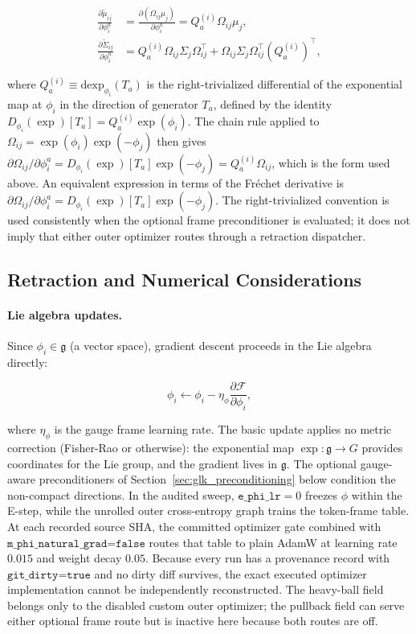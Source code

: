 \documentclass[twoside,11pt]{article}
\begin{document}
\begin{align}
\frac{\partial \tilde{\mu}_{ij}}{\partial \phi_i^a} &= \frac{\partial (\Omega_{ij}\mu_j)}{\partial \phi_i^a}
= Q_a^{(i)} \Omega_{ij} \mu_j, \label{eq:dtilde_mu} \\
\frac{\partial \tilde{\Sigma}_{ij}}{\partial \phi_i^a} &=
Q_a^{(i)} \Omega_{ij} \Sigma_j \Omega_{ij}^\top
+ \Omega_{ij} \Sigma_j \Omega_{ij}^\top (Q_a^{(i)})^\top, \label{eq:dtilde_Sigma}
\end{align}

where $Q_a^{(i)} \equiv \mathrm{dexp}_{\phi_i}(T_a)$ is the right-trivialized differential of the exponential map at $\phi_i$ in the direction of generator $T_a$, defined by the identity $D_{\phi_i}(\exp)[T_a] = Q_a^{(i)} \exp(\phi_i)$. The chain rule applied to $\Omega_{ij} = \exp(\phi_i)\exp(-\phi_j)$ then gives $\partial \Omega_{ij}/\partial \phi_i^a = D_{\phi_i}(\exp)[T_a] \exp(-\phi_j) = Q_a^{(i)} \Omega_{ij}$, which is the form used above. An equivalent expression in terms of the Fréchet derivative is $\partial \Omega_{ij}/\partial \phi_i^a = D_{\phi_i}(\exp)[T_a] \exp(-\phi_j)$. The right-trivialized convention is used consistently when the optional frame preconditioner is evaluated; it does not imply that either outer optimizer routes through a retraction dispatcher.

\subsection{Retraction and Numerical Considerations}

\paragraph{Lie algebra updates.} Since $\phi_i \in \mathfrak{g}$ (a vector space), gradient descent proceeds in the Lie algebra directly:

\begin{equation}
\phi_i \leftarrow \phi_i - \eta_\phi \frac{\partial \mathcal{F}}{\partial \phi_i},
\label{eq:phi_update}
\end{equation}

where $\eta_\phi$ is the gauge frame learning rate. The basic update applies no metric correction (Fisher-Rao or otherwise): the exponential map $\exp: \mathfrak{g} \to G$ provides coordinates for the Lie group, and the gradient lives in $\mathfrak{g}$. The optional gauge-aware preconditioners of Section~\ref{sec:glk_preconditioning} below condition the non-compact directions. In the audited sweep, $\texttt{e\_phi\_lr}=0$ freezes $\phi$ within the E-step, while the unrolled outer cross-entropy graph trains the token-frame table. At each recorded source SHA, the committed optimizer gate combined with $\texttt{m\_phi\_natural\_grad=false}$ routes that table to plain AdamW at learning rate $0.015$ and weight decay $0.05$. Because every run has a provenance record with $\texttt{git\_dirty=true}$ and no dirty diff survives, the exact executed optimizer implementation cannot be independently reconstructed. The heavy-ball field belongs only to the disabled custom outer optimizer; the pullback field can serve either optional frame route but is inactive here because both routes are off.
\end{document}
